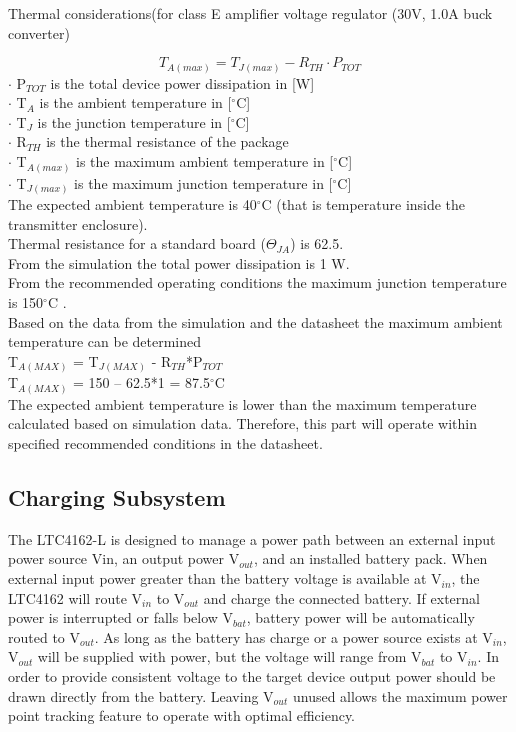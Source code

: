 \documentclass[12pt]{article}
\begin{document}
\noindent
Thermal considerations(for class E amplifier voltage regulator (30V, 1.0A buck converter) 

\begin{equation}
T_{A(max)} = T_{J(max)} - R_{TH} \cdot P_{TOT}
\end{equation}
\noindent
$\cdot $ P$_{TOT}$ is the total device power dissipation in [W]
\\
\noindent
$\cdot $ T$_A$ is the ambient temperature in [$^\circ$C]
\\
\noindent
$\cdot $ T$_J$ is the junction temperature in [$^\circ$C]
\\
\noindent
$\cdot $ R$_{TH}$ is the thermal resistance of the package 
\\
\noindent
$\cdot $ T$_{A(max)}$ is the maximum ambient temperature in [$^\circ$C]
\\
\noindent
$\cdot $ T$_{J(max)}$ is the maximum junction temperature in [$^\circ$C]
\\

\noindent
The expected ambient temperature is 40$^\circ$C (that is temperature inside the transmitter enclosure).\\
Thermal resistance for a standard board ($\Theta_{JA}$) is 62.5 \cite{TPS54160}.\\
From the simulation the total power dissipation is 1 W.\\
From the recommended operating conditions the maximum junction temperature is 150$^\circ$C \cite{TPS54160}.\\
Based on the data from the simulation and the datasheet the maximum ambient temperature can be determined\\
T$_{A(MAX)}$ = T$_{J(MAX)}$ - R$_{TH}$*P$_{TOT}$ \\
T$_{A(MAX)}$ = 150 – 62.5*1 = 87.5$^\circ$C\\
The expected ambient temperature is lower than the maximum temperature calculated based on simulation data. Therefore, this part will operate within specified recommended conditions in the datasheet.

\subsection{Charging Subsystem}

\indent \indent
The LTC4162-L is designed to manage a power path between an external input power source Vin, an output power V$_{out}$, and an installed battery pack. When external input power greater than the battery voltage is available at V$_{in}$, the LTC4162 will route V$_{in}$ to V$_{out}$ and charge the connected battery. If external power is interrupted or falls below V$_{bat}$, battery power will be automatically routed to V$_{out}$. As long as the battery has charge or a power source exists at V$_{in}$, V$_{out}$ will be supplied with power, but the voltage will range from V$_{bat}$ to V$_{in}$. In order to provide consistent voltage to the target device output power should be drawn directly from the battery. Leaving V$_{out}$ unused allows the maximum power point tracking feature to operate with optimal efficiency.\\
\end{document}
